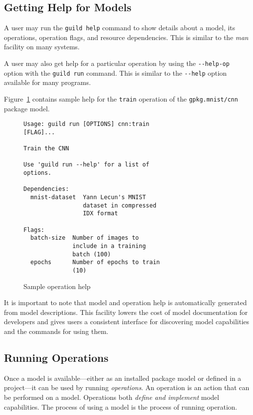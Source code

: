 \documentclass{article}
\begin{document}
\subsection{Getting Help for Models}

A user may run the \verb|guild help| command to show details about a
model, its operations, operation flags, and resource
dependencies. This is similar to the \emph{man} facility on many
systems.

A user may also get help for a particular operation by using the
\verb|--help-op| option with the \verb|guild run| command. This is
similar to the \verb|--help| option available for many programs.

Figure~\ref{fig:op-help} contains sample help for the \verb|train|
operation of the \verb|gpkg.mnist/cnn| package model.

\begin{figure}
\begin{lstlisting}
Usage: guild run [OPTIONS] cnn:train
[FLAG]...

Train the CNN

Use 'guild run --help' for a list of
options.

Dependencies:
  mnist-dataset  Yann Lecun's MNIST
                 dataset in compressed
                 IDX format

Flags:
  batch-size  Number of images to
              include in a training
              batch (100)
  epochs      Number of epochs to train
              (10)
\end{lstlisting}
\caption{Sample operation help}
\label{fig:op-help}
\end{figure}

It is important to note that model and operation help is automatically
generated from model descriptions. This facility lowers the cost of
model documentation for developers and gives users a consistent
interface for discovering model capabilities and the commands for
using them.

\subsection{Running Operations}

Once a model is available---either as an installed package model or
defined in a project---it can be used by running \emph{operations}. An
operation is an action that can be performed on a model. Operations
both \emph{define and implement} model capabilities. The process of
using a model is the process of running operation.
\end{document}
